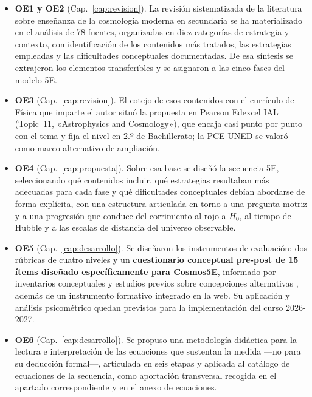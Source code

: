 \begin{itemize}
\item \textbf{OE1 y OE2} (Cap.~\ref{cap:revision}). La revisión sistematizada de la literatura sobre enseñanza de la cosmología moderna en secundaria se ha materializado en el análisis de 78 fuentes, organizadas en diez categorías de estrategia y contexto, con identificación de los contenidos más tratados, las estrategias empleadas y las dificultades conceptuales documentadas. De esa síntesis se extrajeron los elementos transferibles y se asignaron a las cinco fases del modelo 5E.

\item \textbf{OE3} (Cap.~\ref{cap:revision}). El cotejo de esos contenidos con el currículo de Física que imparte el autor situó la propuesta en Pearson Edexcel IAL (Topic~11, «Astrophysics and Cosmology»), que encaja casi punto por punto con el tema y fija el nivel en 2.º de Bachillerato; la PCE UNED se valoró como marco alternativo de ampliación.

\item \textbf{OE4} (Cap.~\ref{cap:propuesta}). Sobre esa base se diseñó la secuencia 5E, seleccionando qué contenidos incluir, qué estrategias resultaban más adecuadas para cada fase y qué dificultades conceptuales debían abordarse de forma explícita, con una estructura articulada en torno a una pregunta motriz y a una progresión que conduce del corrimiento al rojo a $H_0$, al tiempo de Hubble y a las escalas de distancia del universo observable.

\item \textbf{OE5} (Cap.~\ref{cap:desarrollo}). Se diseñaron los instrumentos de evaluación: dos rúbricas de cuatro niveles y un \textbf{cuestionario conceptual pre-post de 15 ítems diseñado específicamente para Cosmos5E}, informado por inventarios conceptuales y estudios previos sobre concepciones alternativas \parencite{salimpour2022,gasparini2025}, además de un instrumento formativo integrado en la web. Su aplicación y análisis psicométrico quedan previstos para la implementación del curso 2026-2027.

\item \textbf{OE6} (Cap.~\ref{cap:desarrollo}). Se propuso una metodología didáctica para la lectura e interpretación de las ecuaciones que sustentan la medida ---no para su deducción formal---, articulada en seis etapas y aplicada al catálogo de ecuaciones de la secuencia, como aportación transversal recogida en el apartado correspondiente y en el anexo de ecuaciones.
\end{itemize}

